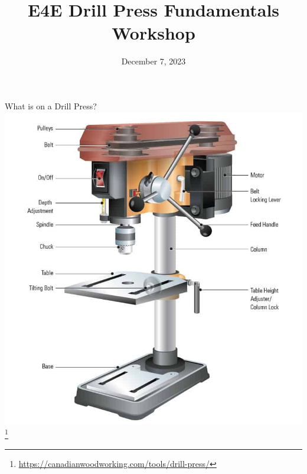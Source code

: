 \documentclass[aspectratio=169]{beamer}
\title{E4E Drill Press Fundamentals Workshop}
\institute{Engineers for Exploration, UC San Diego}
\date{December 7, 2023}
\begin{document}
\maketitle
\begin{frame}{What is on a Drill Press?}
    \centering
    \includegraphics[height=0.8\textheight]{drill_press_anatomy.jpg} \footnote{\url{https://canadianwoodworking.com/tools/drill-press/}}
\end{frame}
\end{document}
